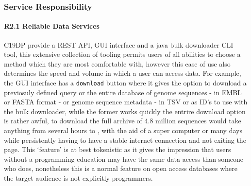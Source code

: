 \documentclass{article}
\begin{document}
\hypertarget{service-responsibility-2}{%
\subsubsection{Service Responsibility}\label{service-responsibility-2}}

\hypertarget{r2.1-reliable-data-services-1}{%
\paragraph{R2.1 Reliable Data
Services}\label{r2.1-reliable-data-services-1}}

C19DP provide a REST API, GUI interface and a java bulk downloader CLI
tool, this extensive collection of tooling permits users of all
abilities to choose a method which they are most comfortable with,
however this ease of use also determines the speed and volume in which a
user can access data. For example, the GUI interface has a
\texttt{download} button where it gives the option to download a
previosuly defined query or the entire database of genome sequences - in
EMBL or FASTA format - or genome sequence metadata - in TSV or as ID's
to use with the bulk downloader, while the former works quickly the
entrire download option is rather awful, to download the full archive of
4.8 million sequences would take anything from several hours to , with
the aid of a super computer or many days while persistently having to
have a stable internet connection and not exiting the page. This
`feature' is at best tokenistic as it gives the impression that users
without a programming education may have the same data access than
someone who does, nonetheless this is a normal feature on open access
databases where the target audience is not explicitly programmers.
\end{document}
